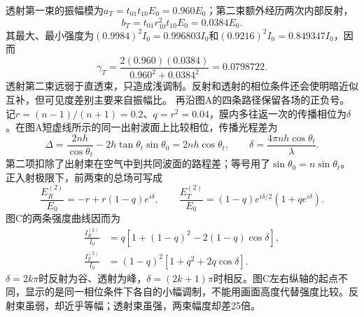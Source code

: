 \documentclass[UTF8,fontset=fandol,a4paper,11pt]{ctexart}
\begin{document}
透射第一束的振幅模为$a_T=t_{01}t_{10}E_0=0.960E_0$；第二束额外经历两次内部反射，
\[
b_T=t_{01}r_{10}^2t_{10}E_0=0.0384E_0.
\]
其最大、最小强度为$(0.9984)^2I_0=0.996803I_0$和$(0.9216)^2I_0=0.849347I_0$，因而
\[
\boxed{\gamma_T=\frac{2(0.960)(0.0384)}
{0.960^2+0.0384^2}=0.0798722}.
\]
透射第二束远弱于直透束，只造成浅调制。反射和透射的相位条件还会使明暗近似互补，但可见度差别主要来自振幅比。
再沿图A的四条路径保留各场的正负号。记$r=(n-1)/(n+1)=0.2$、$q=r^2=0.04$，膜内多往返一次的传播相位为$\delta$。在图A短虚线所示的同一出射波面上比较相位，传播光程差为
\[
\Delta= \frac{2nh}{\cos\theta_t}
-2h\tan\theta_t\sin\theta_0
=2nh\cos\theta_t,\qquad
\delta=\frac{4\pi nh\cos\theta_t}{\lambda}.
\]
第二项扣除了出射束在空气中到共同波面的路程差；等号用了$\sin\theta_0=n\sin\theta_t$。正入射极限下，前两束的总场可写成
\[
\frac{E_R^{(2)}}{E_0}=-r+r(1-q)e^{i\delta},\qquad
\frac{E_T^{(2)}}{E_0}=(1-q)e^{i\delta/2}(1+qe^{i\delta}).
\]
图C的两条强度曲线因而为
\[
\begin{aligned}
\frac{I_R^{(2)}}{I_0}&=q[1+(1-q)^2-2(1-q)\cos\delta],\\
\frac{I_T^{(2)}}{I_0}&=(1-q)^2[1+q^2+2q\cos\delta].
\end{aligned}
\]
$\delta=2k\pi$时反射为谷、透射为峰，$\delta=(2k+1)\pi$时相反。图C左右纵轴的起点不同，显示的是同一相位条件下各自的小幅调制，不能用画面高度代替强度比较。反射束虽弱，却近乎等幅；透射束虽强，两束幅度却差25倍。
\end{document}
